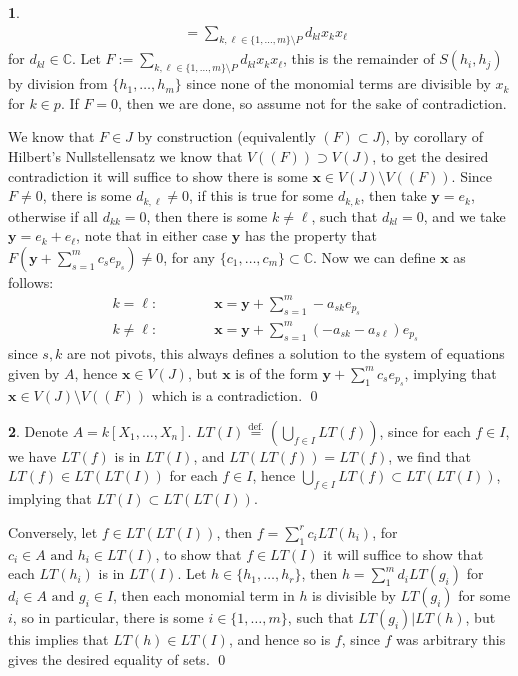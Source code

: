 \documentclass[11pt]{article}
\theoremstyle{definition}
\newtheorem{pb}{}
\newcommand{\set}[1]{\{#1\}}
\newcommand{\tand}{\text{ and }}
\begin{document}
\begin{pb}
\begin{align*}
            &= \sum_{k,\ell \in \set{1,\hdots,m}\setminus P} d_{kl}x_kx_\ell
        \end{align*}
        for \(d_{kl} \in \mathbb{C}\). Let \(F := \sum_{k,\ell \in \set{1,\hdots,m}\setminus P} d_{kl}x_kx_\ell\), this is the remainder of \(S(h_i,h_j)\) by division from \(\set{h_1,\hdots,h_m}\) since none of the monomial terms are divisible by \(x_k\) for \(k \in p\). If \(F = 0\), then we are done, so assume not for the sake of contradiction.

        We know that \(F \in J\) by construction (equivalently \((F) \subset J\)), by corollary of Hilbert's Nullstellensatz we know that \(V((F)) \supset V(J)\), to get the desired contradiction it will suffice to show there is some \(\mathbf{x} \in V(J) \setminus V((F))\). Since \(F \neq 0\), there is some \(d_{k,\ell} \neq 0\), if this is true for some \(d_{k,k}\), then take \(\mathbf{y} = e_k\), otherwise if all \(d_{kk} = 0\), then there is some \(k \neq \ell\), such that \(d_{kl} = 0\), and we take \(\mathbf{y} = e_k + e_\ell\), note that in either case \(\mathbf{y}\) has the property that \(F(\mathbf{y} + \sum_{s=1}^m c_se_{p_s}) \neq 0\), for any \(\set{c_1,\hdots,c_m} \subset \mathbb{C}\). Now we can define \(\mathbf{x}\) as follows:
        \begin{align*}
            &k = \ell: \quad\quad\quad\quad \mathbf{x} = \mathbf{y} + \sum_{s = 1}^m -a_{sk} e_{p_s} \\
            &k \neq \ell: \quad\quad\quad\quad \mathbf{x} = \mathbf{y} + \sum_{s = 1}^m (-a_{sk} - a_{s\ell}) e_{p_s}
        \end{align*}
        since \(s,k\) are not pivots, this always defines a solution to the system of equations given by \(A\), hence \(\mathbf{x} \in V(J)\), but \(\mathbf{x}\) is of the form \(\mathbf{y} + \sum_1^m c_s e_{p_s}\), implying that \(\mathbf{x} \in V(J) \setminus V((F))\) which is a contradiction. \qed
    \end{pb}
    \newpage
    \begin{pb}
        Denote \(A = k[X_1,\hdots,X_n]\). \(LT(I) \overset{\text{def.}}{=} \left(\bigcup_{f \in I}LT(f)\right)\), since for each \(f \in I\), we have \(LT(f)\) is in \(LT(I)\), and \(LT(LT(f)) = LT(f)\), we find that \(LT(f) \in LT(LT(I))\) for each \(f \in I\), hence \(\bigcup_{f \in I}LT(f) \subset LT(LT(I))\), implying that \(LT(I) \subset LT(LT(I))\).

        Conversely, let \(f \in LT(LT(I))\), then \(f = \sum_1^r c_iLT(h_i)\), for \(c_i \in A \tand h_i \in LT(I)\), to show that \(f \in LT(I)\) it will suffice to show that each \(LT(h_i)\) is in \(LT(I)\). Let \(h \in \set{h_1,\hdots,h_r}\), then \(h = \sum_1^m d_iLT(g_i)\) for \(d_i \in A \tand g_i \in I\), then each monomial term in \(h\) is divisible by \(LT(g_i)\) for some \(i\), so in particular, there is some \(i \in \set{1,\hdots,m}\), such that \(LT(g_i) \vert LT(h)\), but this implies that \(LT(h) \in LT(I)\), and hence so is \(f\), since \(f\) was arbitrary this gives the desired equality of sets. \qed
    \end{pb}
\end{document}
